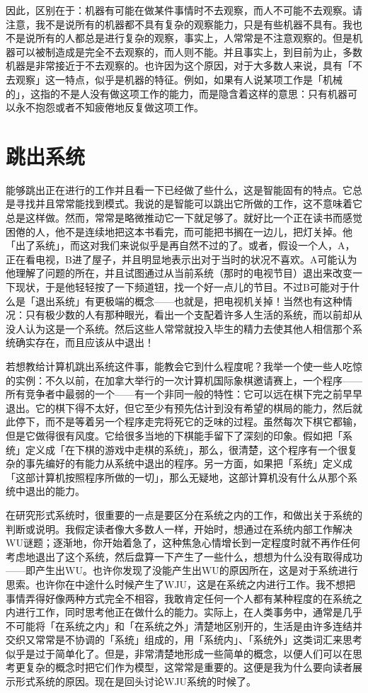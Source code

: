\documentclass[
  12pt,
  twoside,
  openright,
  oldfontcommands,
]{memoir}
\begin{document}
因此，区别在于：机器有可能在做某件事情时不去观察，而人不可能不去观察。请注意，我不是说所有的机器都不具有复杂的观察能力，只是有些机器不具有。我也不是说所有的人都总是进行复杂的观察，事实上，人常常是不注意观察的。但是机器可以被制造成是完全不去观察的，而人则不能。并且事实上，到目前为止，多数机器是非常接近于不去观察的。也许因为这个原因，对于大多数人来说，具有「不去观察」这一特点，似乎是机器的特征。例如，如果有人说某项工作是「机械的」，这指的不是人没有做这项工作的能力，而是隐含着这样的意思：只有机器可以永不抱怨或者不知疲倦地反复做这项工作。

\section{跳出系统}

能够跳出正在进行的工作并且看一下已经做了些什么，这是智能固有的特点。它总是寻找并且常常能找到模式。我说的是智能可以跳出它所做的工作，这不意味着它总是这样做。然而，常常是略微推动它一下就足够了。就好比一个正在读书而感觉困倦的人，他不是连续地把这本书看完，而可能把书搁在一边儿，把灯关掉。他「出了系统」，而这对我们来说似乎是再自然不过的了。或者，假设一个人，A，正在看电视，B进了屋子，并且明显地表示出对于当时的状况不喜欢。A可能认为他理解了问题的所在，并且试图通过从当前系统（那时的电视节目）退出来改变一下现状，于是他轻轻按了一下频道钮，找一个好一点儿的节目。不过B可能对于什么是「退出系统」有更极端的概念------也就是，把电视机关掉！当然也有这种情况：只有极少数的人有那种眼光，看出一个支配着许多人生活的系统，而以前却从没人认为这是一个系统。然后这些人常常就投入毕生的精力去使其他人相信那个系统确实存在，而且应该从中退出！

若想教给计算机跳出系统这件事，能教会它到什么程度呢？我举一个使一些人吃惊的实例：不久以前，在加拿大举行的一次计算机国际象棋邀请赛上，一个程序------所有竞争者中最弱的一个------有一个非同一般的特性：它可以远在棋下完之前早早退出。它的棋下得不太好，但它至少有预先估计到没有希望的棋局的能力，然后就此停下，而不是等着另一个程序走完将死它的乏味的过程。虽然每次下棋它都输，但是它做得很有风度。它给很多当地的下棋能手留下了深刻的印象。假如把「系统」定义成「在下棋的游戏中走棋的系统」，那么，很清楚，这个程序有一个很复杂的事先编好的有能力从系统中退出的程序。另一方面，如果把「系统」定义成「这部计算机按照程序所做的一切」，那么无疑地，这部计算机没有什么从那个系统中退出的能力。

在研究形式系统时，很重要的一点是要区分在系统之内的工作，和做出关于系统的判断或说明。我假定读者像大多数人一样，开始时，想通过在系统内部工作解决WU谜题；逐渐地，你开始着急了，这种焦急心情增长到一定程度时就不再作任何考虑地退出了这个系统，然后盘算一下产生了一些什么，想想为什么没有取得成功------即产生出WU。也许你发现了没能产生出WU的原因所在，这是对于系统进行思索。也许你在中途什么时候产生了WJU，这是在系统之内进行工作。我不想把事情弄得好像两种方式完全不相容，我敢肯定任何一个人都有某种程度的在系统之内进行工作，同时思考他正在做什么的能力。实际上，在人类事务中，通常是几乎不可能将「在系统之内」和「在系统之外」清楚地区别开的，生活是由许多连结并交织又常常是不协调的「系统」组成的，用「系统内」、「系统外」这类词汇来思考似乎是过于简单化了。但是，非常清楚地形成一些简单的概念，以便人们可以在思考更复杂的概念时把它们作为模型，这常常是重要的。这便是我为什么要向读者展示形式系统的原因。现在是回头讨论WJU系统的时候了。
\end{document}
